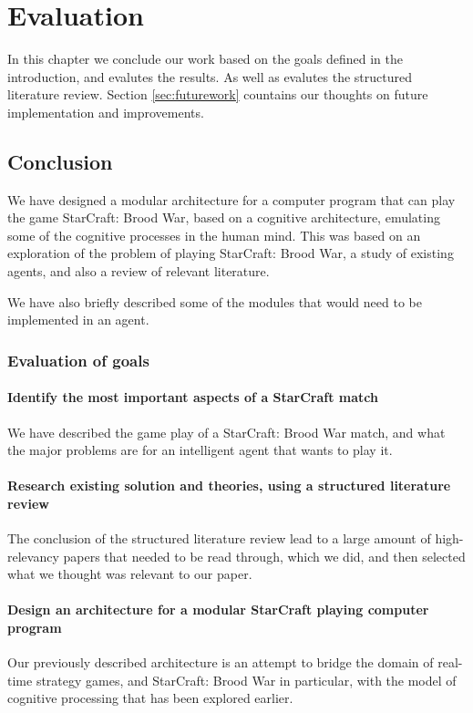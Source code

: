 
\chapter{Evaluation}
In this chapter we conclude our work based on the goals defined in the introduction, and evalutes the results. As well as evalutes the structured literature review. Section \ref{sec:futurework} countains our thoughts on future implementation and improvements.
\section{Conclusion}
We have designed a modular architecture for a computer program that can play the
game StarCraft: Brood War, based on a cognitive architecture, emulating some of
the cognitive processes in the human mind. This was based on an exploration of
the problem of playing StarCraft: Brood War, a study of existing agents, and
also a review of relevant literature.

We have also briefly described some of the modules that would need to be
implemented in an agent.

\subsection{Evaluation of goals}
\subsubsection{Identify the most important aspects of a StarCraft match}
We have described the game play of a StarCraft: Brood War match, and what the
major problems are for an intelligent agent that wants to play it.
\subsubsection{Research existing solution and theories, using a structured
literature review}
The conclusion of the structured literature review lead to a large amount of
high-relevancy papers that needed to be read through, which we did, and then
selected what we thought was relevant to our paper.
\subsubsection{Design an architecture for a modular StarCraft playing computer
program}
Our previously described architecture is an attempt to bridge the domain of
real-time strategy games, and StarCraft: Brood War in particular, with the
model of cognitive processing that has been explored earlier.



